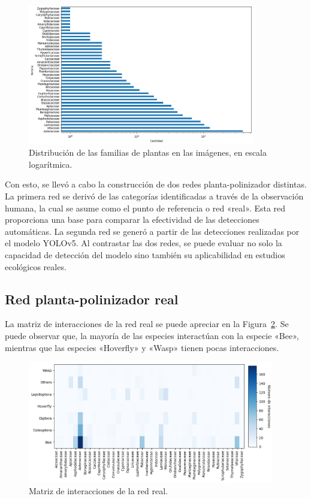 \begin{figure}[H]
    \centering
    \includegraphics[width=0.885\textwidth]{Figuras/distribucion_familias.png}
    \caption{Distribución de las familias de plantas en las imágenes, en escala logarítmica.}
    \label{fig:distribucion_familias}
\end{figure}

Con esto, se llevó a cabo la construcción de dos redes planta-polinizador distintas. La primera red se derivó de las categorías identificadas a través de la observación humana, la cual se asume como el punto de referencia o red «real». Esta red proporciona una base para comparar la efectividad de las detecciones automáticas. La segunda red se generó a partir de las detecciones realizadas por el modelo YOLOv5. Al contrastar las dos redes, se puede evaluar no solo la capacidad de detección del modelo sino también su aplicabilidad en estudios ecológicos reales.

\subsection{Red planta-polinizador real}

La matriz de interacciones de la red real se puede apreciar en la Figura~\ref{fig:matriz_interacciones_real}. Se puede observar que, la mayoría de las especies interactúan con la especie «Bee», mientras que las especies «Hoverfly» y «Wasp» tienen pocas interacciones. 

\begin{figure}[H]
    \centering
    \includegraphics[width=0.96\textwidth]{Figuras/matriz_interacciones_real.png}
    \caption{Matriz de interacciones de la red real.}
    \label{fig:matriz_interacciones_real}
\end{figure}

